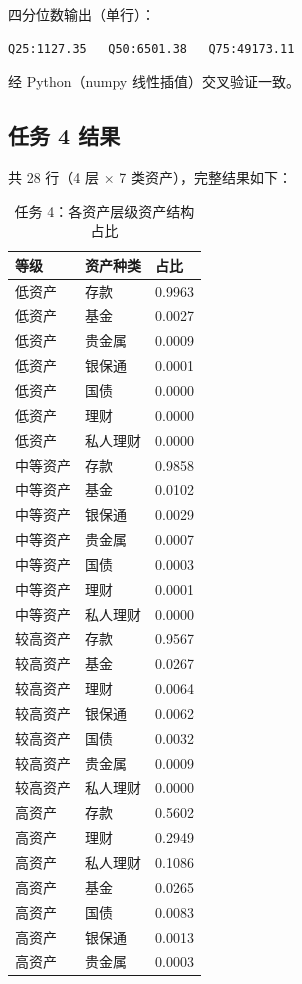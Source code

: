 \documentclass[UTF8,a4paper,12pt]{ctexart}
\begin{document}
四分位数输出（单行）：

\begin{lstlisting}[style=terminal]
Q25:1127.35   Q50:6501.38   Q75:49173.11
\end{lstlisting}

经 Python（numpy 线性插值）交叉验证一致。

\subsection{任务 4 结果}

共 28 行（4 层 $\times$ 7 类资产），完整结果如下：

\begin{table}[H]
  \centering
  \caption{任务 4：各资产层级资产结构占比}
  \label{tab:t4}
  \begin{tabular}{lll}
    \toprule
    等级 & 资产种类 & 占比 \\
    \midrule
    低资产   & 存款   & 0.9963 \\
    低资产   & 基金   & 0.0027 \\
    低资产   & 贵金属 & 0.0009 \\
    低资产   & 银保通 & 0.0001 \\
    低资产   & 国债   & 0.0000 \\
    低资产   & 理财   & 0.0000 \\
    低资产   & 私人理财 & 0.0000 \\
    中等资产 & 存款   & 0.9858 \\
    中等资产 & 基金   & 0.0102 \\
    中等资产 & 银保通 & 0.0029 \\
    中等资产 & 贵金属 & 0.0007 \\
    中等资产 & 国债   & 0.0003 \\
    中等资产 & 理财   & 0.0001 \\
    中等资产 & 私人理财 & 0.0000 \\
    较高资产 & 存款   & 0.9567 \\
    较高资产 & 基金   & 0.0267 \\
    较高资产 & 理财   & 0.0064 \\
    较高资产 & 银保通 & 0.0062 \\
    较高资产 & 国债   & 0.0032 \\
    较高资产 & 贵金属 & 0.0009 \\
    较高资产 & 私人理财 & 0.0000 \\
    高资产   & 存款   & 0.5602 \\
    高资产   & 理财   & 0.2949 \\
    高资产   & 私人理财 & 0.1086 \\
    高资产   & 基金   & 0.0265 \\
    高资产   & 国债   & 0.0083 \\
    高资产   & 银保通 & 0.0013 \\
    高资产   & 贵金属 & 0.0003 \\
    \bottomrule
  \end{tabular}
\end{table}
\end{document}

